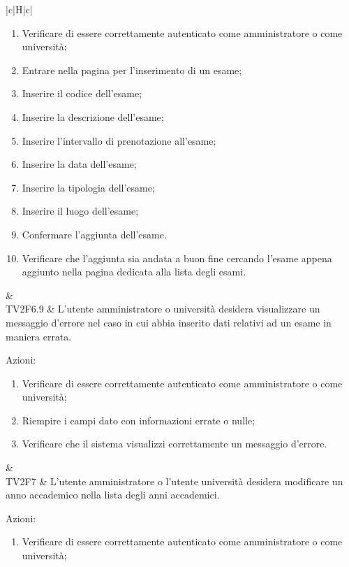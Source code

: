 \begin{longtable}{|c|H|c|}
\begin{flushleft}
		\end{flushleft}
		\begin{enumerate}
			\item Verificare di essere correttamente autenticato come amministratore o come università;
			\item Entrare nella pagina per l'inserimento di un esame;
			\item Inserire il codice dell'esame;
			\item Inserire la descrizione dell'esame;
			\item Inserire l'intervallo di prenotazione all'esame;
			\item Inserire la data dell'esame;
			\item Inserire la tipologia dell'esame;
			\item Inserire il luogo dell'esame;
			\item Confermare l'aggiunta dell'esame.
			\item Verificare che l'aggiunta sia andata a buon fine cercando l'esame appena aggiunto nella pagina dedicata alla lista degli esami.
		\end{enumerate} & \Tni \\
	\hline
	TV2F6.9 & L'utente amministratore o università desidera visualizzare un messaggio d'errore nel caso in cui abbia inserito dati relativi ad un esame in maniera errata. \newline \begin{flushleft}
		Azioni:\newline
	\end{flushleft} 
	\begin{enumerate}
		\item Verificare di essere correttamente autenticato come amministratore o come università;
		\item Riempire i campi dato con informazioni errate o nulle;
		\item Verificare che il sistema visualizzi correttamente un messaggio d'errore.
	\end{enumerate} & \Tni \\
	\hline
	TV2F7 & L'utente amministratore o l'utente università desidera modificare un anno accademico nella lista degli anni accademici. \newline \begin{flushleft}
		Azioni:\newline
	\end{flushleft} 
	\begin{enumerate}
		\item Verificare di essere correttamente autenticato come amministratore o come università;

\end{enumerate}
\end{longtable}
